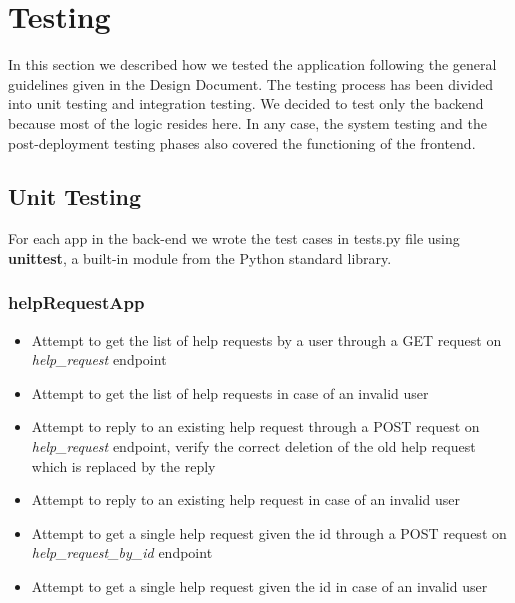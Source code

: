 \documentclass[table, 12pt]{article}
\begin{document}
\newpage
\section{Testing}

In this section we described how we tested the application following the general guidelines given in the Design Document.
The testing process has been divided into unit testing and integration testing.
We decided to test only the backend because most of the logic resides here.
In any case, the system testing and the post-deployment testing phases also covered the functioning of the frontend.

\subsection{Unit Testing}
For each app in the back-end we wrote the test cases in tests.py file using \textbf{unittest}, a built-in module from the Python standard library.
\subsubsection*{helpRequestApp}
\begin{itemize}
    \item Attempt to get the list of help requests by a user through a GET request on \textit{help\_request} endpoint
    \item Attempt to get the list of help requests in case of an invalid user
    \item Attempt to reply to an existing help request through a POST request on \textit{help\_request} endpoint, verify the correct deletion of the old help request which is replaced by the reply
    \item Attempt to reply to an existing help request in case of an invalid user
    \item Attempt to get a single help request given the id through a POST request on \textit{help\_request\_by\_id} endpoint
    \item Attempt to get a single help request given the id in case of an invalid user
\end{itemize}
\end{document}
